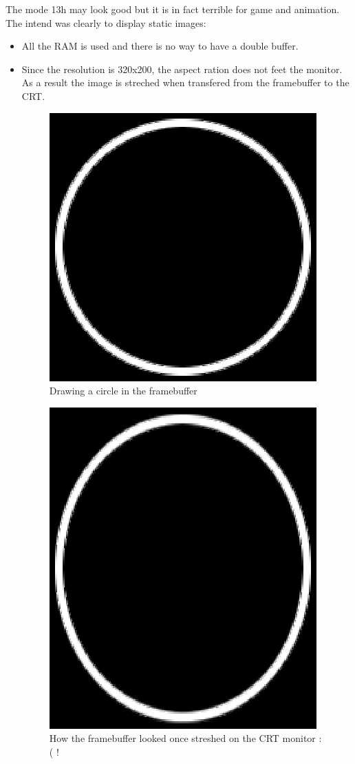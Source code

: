 \documentclass[book.tex]{subfiles}
\begin{document}
  
  The mode 13h may look good but it is in fact terrible for game and animation. The intend was clearly to display static images:
  \begin{itemize}
\item All the RAM is used and there is no way to have a double buffer.
\item Since the resolution is 320x200, the aspect ration does not feet the monitor. As a result the image is streched when transfered from the 
framebuffer to the CRT.

 \begin{figure}[H]
\centering
\includegraphics[scale=1.0]{imgs/circleframebuffer.eps}
%
\caption{Drawing a circle in the framebuffer}
\end{figure}

 \begin{figure}[H]
\centering
\includegraphics[scale=1.0]{imgs/circlescreen.eps}
%
\caption{How the framebuffer looked once streshed on the CRT monitor :( !}
\end{figure}


\end{itemize}
\end{document}
